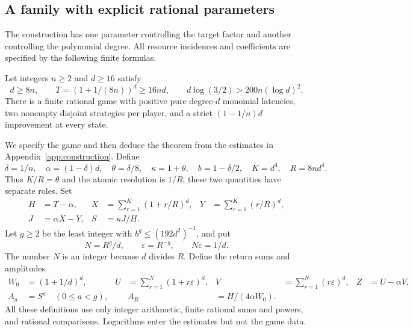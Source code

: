 \documentclass[manuscript,review,anonymous]{acmart}
\begin{document}
\subsection{A family with explicit rational parameters}
The construction has one parameter controlling the target factor and another controlling the polynomial degree. All resource incidences and coefficients are specified by the following finite formulas.
\begin{theorem}\label{thm:uniformfamily}
Let integers $n\ge2$ and $d\ge16$ satisfy
\begin{equation}\label{eq:uniformconditions}
 d\ge8n,\qquad T=(1+1/(8n))^d\ge16nd,\qquad
 d\log(3/2)>200n(\log d)^2.
\end{equation}
There is a finite rational game with positive pure degree-$d$ monomial latencies, two nonempty disjoint strategies per player, and a strict $(1-1/n)d$ improvement at every state.
\end{theorem}
We specify the game and then deduce the theorem from the estimates in Appendix~\ref{app:construction}. Define
\begin{equation}\label{eq:appfirstparams}
 \delta=1/n,\quad\alpha=(1-\delta)d,\quad
 \theta=\delta/8,\quad\kappa=1+\theta,\quad
 b=1-\delta/2,\quad K=d^4,\quad R=8nd^4.
\end{equation}
Thus $K/R=\theta$ and the atomic resolution is $1/R$; these two quantities have separate roles. Set
\begin{align}
 H&=T-\alpha,&
 X&=\sum_{r=1}^K(1+r/R)^d,&
 Y&=\sum_{r=1}^K(r/R)^d,\label{eq:appXY}\\
 J&=\alpha X-Y,&S&=\kappa J/H.\nonumber
\end{align}
Let $g\ge2$ be the least integer with $b^g\le(192d^2)^{-1}$, and put
\begin{equation}\label{eq:appdepthparams}
 N=R^g/d,\qquad\varepsilon=R^{-g},\qquad N\varepsilon=1/d.
\end{equation}
The number $N$ is an integer because $d$ divides $R$. Define the return sums and amplitudes
\begin{align}
 W_0&=(1+1/d)^d,&
 U&=\sum_{r=1}^N(1+r\varepsilon)^d,&
 V&=\sum_{r=1}^N(r\varepsilon)^d,&Z&=U-\alpha V,\label{eq:appreturn}\\
 A_a&=S^a\quad(0\le a<g),&&
 A_R&=H/(4\alpha W_0).\nonumber
\end{align}
All these definitions use only integer arithmetic, finite rational sums and powers, and rational comparisons. Logarithms enter the estimates but not the game data.
\end{document}
